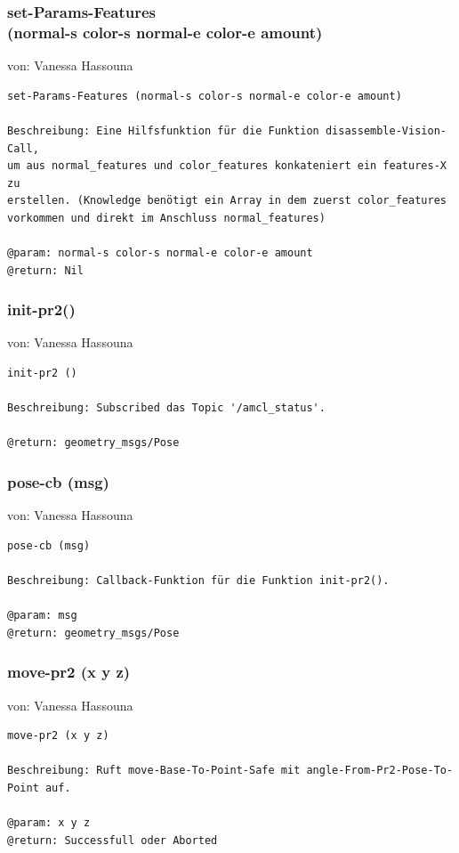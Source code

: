 \documentclass{suturo}
\makeatletter
\newcommand{\chapterauthor}[1]{%
  {\parindent0pt\vspace*{-27pt}%
  \linespread{0}\small\begin{flushright}von: #1\end{flushright}%
  \par\nobreak\vspace*{0pt}}
  \@afterheading%
}
\makeatother
\begin{document}
\subsubsection{set-Params-Features \\
(normal-s color-s normal-e color-e amount)}
\chapterauthor{Vanessa Hassouna}
\begin{verbatim}
set-Params-Features (normal-s color-s normal-e color-e amount)

Beschreibung: Eine Hilfsfunktion für die Funktion disassemble-Vision-Call, 
um aus normal_features und color_features konkateniert ein features-X zu 
erstellen. (Knowledge benötigt ein Array in dem zuerst color_features 
vorkommen und direkt im Anschluss normal_features)

@param: normal-s color-s normal-e color-e amount
@return: Nil
\end{verbatim}


\subsubsection{init-pr2()}
\chapterauthor{Vanessa Hassouna}
\begin{verbatim}
init-pr2 ()

Beschreibung: Subscribed das Topic '/amcl_status'.

@return: geometry_msgs/Pose
\end{verbatim}

\subsubsection{pose-cb (msg)}
\chapterauthor{Vanessa Hassouna}
\begin{verbatim}
pose-cb (msg)

Beschreibung: Callback-Funktion für die Funktion init-pr2().

@param: msg
@return: geometry_msgs/Pose
\end{verbatim}

\subsubsection{move-pr2 (x y z)}
\chapterauthor{Vanessa Hassouna}
\begin{verbatim}
move-pr2 (x y z)

Beschreibung: Ruft move-Base-To-Point-Safe mit angle-From-Pr2-Pose-To-Point auf.

@param: x y z 
@return: Successfull oder Aborted
\end{verbatim}
\end{document}
